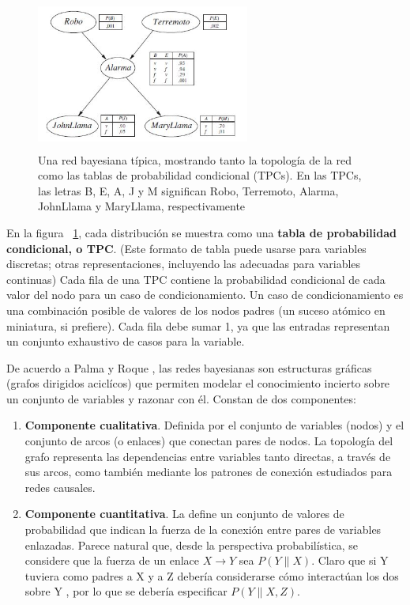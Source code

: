 \documentclass[10pt,conference]{IEEEtran}
\begin{document}
\begin{figure}[H]
\begin{center}
\includegraphics[width=7cm, height=5cm]{figuras/R2.JPG}
\caption{Una red bayesiana típica, mostrando tanto la topología de la red como las tablas de probabilidad condicional (TPCs). En las TPCs, las letras B, E, A, J y M significan Robo, Terremoto, Alarma, JohnLlama y MaryLlama, respectivamente}
\label{R2} 
\end{center}
\end{figure}

En la figura ~\ref{R2}, cada distribución se muestra como una \textbf{tabla de probabilidad condicional, o TPC}. (Este formato de tabla puede usarse para variables discretas; otras representaciones, incluyendo las adecuadas para variables continuas) Cada fila de una TPC contiene la probabilidad condicional de cada valor del nodo para un caso de condicionamiento. Un caso de condicionamiento es una combinación posible de valores de los nodos padres (un suceso atómico en miniatura, si prefiere). Cada fila debe sumar 1, ya que las entradas representan un conjunto exhaustivo de casos para la variable.

De acuerdo a Palma y Roque \citep{morales2011inteligencia}, las redes bayesianas son estructuras gráficas (grafos dirigidos aciclícos) que permiten modelar el conocimiento incierto sobre un conjunto de variables y razonar con él. Constan de dos componentes:

\begin{enumerate}
    \item \textbf{Componente cualitativa}. Definida por el conjunto de variables (nodos) y el conjunto de arcos (o enlaces) que conectan pares de nodos. La topología del grafo representa las dependencias entre variables tanto directas, a través de sus arcos, como también mediante los patrones de conexión estudiados para redes causales. 
    
    \item \textbf{Componente cuantitativa}. La define un conjunto de valores de probabilidad que indican la fuerza de la conexión entre pares de variables enlazadas. Parece natural que, desde la perspectiva probabilística, se considere que la fuerza de un enlace $X → Y$ sea $P(Y\|X)$. Claro que si Y tuviera como padres a X y a Z debería considerarse cómo interactúan los dos sobre Y , por lo que se debería especificar $P(Y\|X,Z).$
\end{enumerate}
\end{document}
